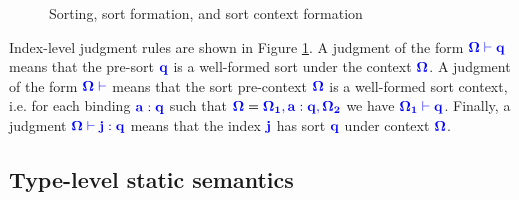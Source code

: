 \documentclass[sigplan,10pt,review,anonymous]{acmart}
\newcommand{\blum}[1]{\mathbf{\color{blue}{#1}}}
\begin{document}
\begin{figure}
\caption{Sorting, sort formation, and sort context formation}
\label{fig:sorting}
\end{figure}

Index-level judgment rules are shown in Figure \ref{fig:sorting}. A judgment of the form $\blum{\Omega \vdash q}$ means that the pre-sort $\blum{q}$ is a well-formed sort under the context $\blum{\Omega}$. A judgment of the form $\blum{\Omega \vdash}$ means that the sort pre-context $\blum{\Omega}$ is a well-formed sort context, i.e. for each binding $\blum{a : q}$ such that $\blum{\Omega} = \blum{\Omega_1, a : q, \Omega_2}$ we have $\blum{\Omega_1 \vdash q}$. Finally, a judgment $\blum{\Omega \vdash j : q}$ means that the index $\blum{j}$ has sort $\blum{q}$ under context $\blum{\Omega}$.

\subsection{Type-level static semantics}
\end{document}
